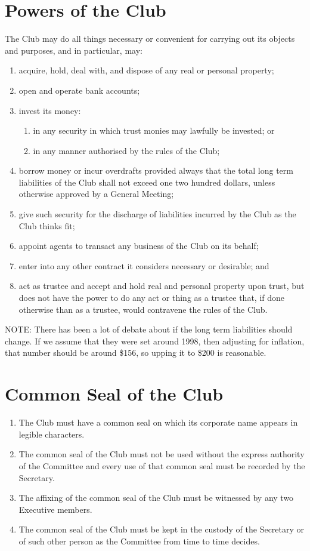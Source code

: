 \documentclass[11pt]{article} %
\begin{document}
\section{Powers of the Club}
The Club may do all things necessary or convenient for carrying out its objects and purposes, and in particular, may:
\begin{enumerate}
	\item acquire, hold, deal with, and dispose of any real or personal property;
	\item open and operate bank accounts;
	\item invest its money:
	\begin{enumerate}[1.]
			\item in any security in which trust monies may lawfully be invested; or
			\item in any manner authorised by the rules of the Club;
		\end{enumerate}
	\item borrow money or incur overdrafts provided always that the total long term liabilities of the Club shall not exceed {\color{red}one} {\color{ForestGreen}two} hundred dollars, unless otherwise approved by a General Meeting;
	\item give such security for the discharge of liabilities incurred by the Club as the Club thinks fit;
	\item appoint agents to transact any business of the Club on its behalf;
	\item enter into any other contract it considers necessary or desirable; and
	\item act as trustee and accept and hold real and personal property upon trust, but does not have the power to do any act or thing as a trustee that, if done otherwise than as a trustee, would contravene the rules of the Club.
\end{enumerate}

{\color{Cyan}NOTE:
There has been a lot of debate about if the long term liabilities should change. If we assume that they were set around 1998, then adjusting for inflation, that number should be around \$156, so upping it to \$200 is reasonable.
}

\section{Common Seal of the Club}
\begin{enumerate}
	\item The Club must have a common seal on which its corporate name appears in legible characters.
	\item The common seal of the Club must not be used without the express authority of the Committee and every use of that common seal must be recorded by the Secretary.
	\item The affixing of the common seal of the Club must be witnessed by any two Executive members.
	\item The common seal of the Club must be kept in the custody of the Secretary or of such other person as the Committee from time to time decides.
\end{enumerate}
\end{document}
